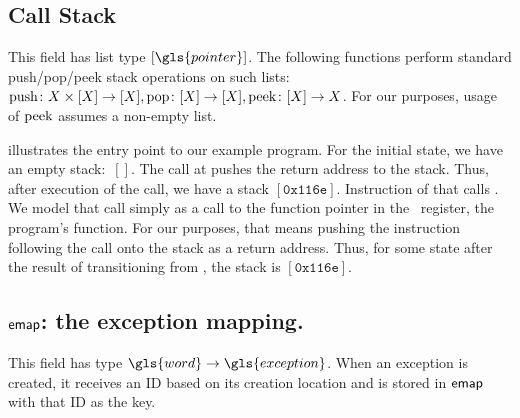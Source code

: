 \subsection{Call Stack}
This field has list type $[\gls{pointer}]$.
The following functions perform standard push/pop/peek stack operations on such lists:
\(
\operatorname{push}\colon X\times[X]\to[X],
\operatorname{pop}\colon[X]\to[X],
\operatorname{peek}\colon[X]\to X
\).
For our purposes, usage of $\operatorname{peek}$ assumes a non-empty list. %
\begin{example}
   illustrates the entry point to our example program.
  For the initial state, we have an empty stack:~$[]$.
  The call at  pushes the return address to the stack.
  Thus, after execution of the call, we have a stack $[\mathtt{0x116e}]$.
  Instruction  of that  calls .
  We model that call simply as a call to the function pointer in the \rdi\ register, the program's  function.
  For our purposes, that means pushing the instruction following the call onto the stack as a return address.
  Thus, for some state after the result of transitioning from , the stack is $[\mathtt{0x116e}]$.
\end{example}

\subsection{$\operatorname{\mathsf{emap}}$: the exception mapping.}
This field has type $\gls{word}\to\gls{exception}$.
When an exception is created, it receives an ID based on its creation location and is stored in $\operatorname{\mathsf{emap}}$ with that ID as the key.

